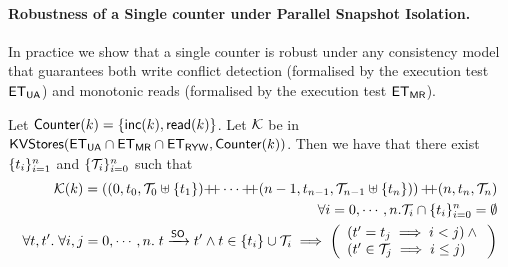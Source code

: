 \paragraph{Robustness of a Single counter under Parallel Snapshot Isolation.}
In practice we show that a single counter is robust under any consistency model 
that guarantees both write conflict detection (formalised by the execution test 
$\mathsf{ET}_{\mathsf{UA}}$) and monotonic reads (formalised by the execution test $\mathsf{ET}_{\mathsf{MR}}$). 
\begin{proposition}
\label{prop:counter_hhshape}
Let $\mathsf{Counter}(k) = \{\mathsf{inc}(k), \mathsf{read}(k)\}$.
Let $\mathcal{K}$ be in $\mathsf{KVStores}(\mathsf{ET}_{\mathsf{UA}} \cap \mathsf{ET}_{\mathsf{MR}} \cap \mathsf{ET}_{\mathsf{RYW}}, \mathsf{Counter}(k))$. Then we have that 
there exist $\{t_i\}_{i = 1}^{n}$ and $\{\mathcal{T}_{i}\}_{i = 0}^{n}$ such that 
\begin{align}
\hh(\ke) = \left( (0, \txid_{0}, \T_{0} \uplus \{\txid_1\}) \lcat \cdots \lcat (n-1, \txid_{n-1}, \T_{n-1} \uplus \{\txid_{n}\}) \right) 
\lcat (n, \txid_{n}, \T_{n}) \label{eq:psi_counter_shape}\\
\forall i=0,\cdots,n.\T_{i} \cap \{\txid_{i}\}_{i=0}^{n} = \emptyset \label{eq:psi_counter_rwtxs}\\
\forall \txid, \txid'.\;\forall i,j=0,\cdots, n.\; \txid \xrightarrow{\PO} \txid' 
\wedge \txid \in \{\txid_{i}\} \cup \T_{i} \implies 
\left(\begin{array}{l}
(\txid' = \txid_{j} \implies i < j) \wedge {} \\
(\txid' \in \T_{j} \implies i \leq j) \\
\end{array}\right) \label{eq:psi_counter_so}
\end{align}
%
%
%
\end{proposition}

